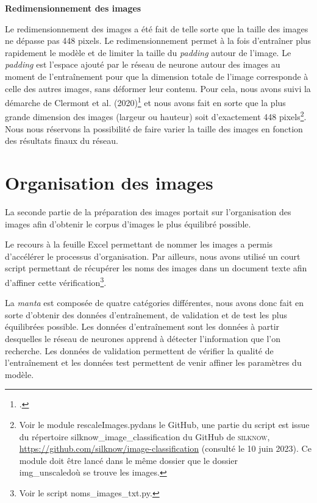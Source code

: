 \documentclass[a4paper, twoside, 12pt]{book}
\begin{document}
\textbf{Redimensionnement des images}

Le redimensionnement des images a été fait de telle sorte que la taille des images ne dépasse pas 448 pixels. Le redimensionnement permet à la fois d'entraîner plus rapidement le modèle et de limiter la taille du \textit{padding} autour de l'image. Le \textit{padding} est l'espace ajouté par le réseau de neurone autour des images au moment de l'entraînement pour que la dimension totale de l'image corresponde à celle des autres images, sans déformer leur contenu. Pour cela, nous avons suivi la démarche de Clermont et al. (2020)\footcite{clermontAssessingSemanticSimilarity2020} et nous avons fait en sorte que la plus grande dimension des images (largeur ou hauteur) soit d'exactement 448 pixels\footnote{Voir le module \og rescaleImages.py\fg \:dans le GitHub, une partie du script est issue du répertoire \og silknow\_image\_classification \fg \:du GitHub de \textsc{silknow}, \url{https://github.com/silknow/image-classification} (consulté le 10 juin 2023). Ce module doit être lancé dans le même dossier que le dossier \og \\img\_unscaled\fg \:où se trouve les images.}. Nous nous réservons la possibilité de faire varier la taille des images en fonction des résultats finaux du réseau.

\section{Organisation des images}

La seconde partie de la préparation des images portait sur l'organisation des images afin d'obtenir le corpus d'images le plus équilibré possible.

Le recours à la feuille Excel permettant de nommer les images a permis d'accélérer le processus d'organisation. Par ailleurs, nous avons utilisé un court script permettant de récupérer les noms des images dans un document texte afin d'affiner cette vérification\footnote{Voir le script \og noms\_images\_txt.py\fg.}.

La \textit{manta} est composée de quatre catégories différentes, nous avons donc fait en sorte d'obtenir des données d'entraînement, de validation et de test les plus équilibrées possible. Les données d'entraînement sont les données à partir desquelles le réseau de neurones \og apprend \fg \:à détecter l'information que l'on recherche. Les données de validation permettent de vérifier la qualité de l'entraînement et les données test permettent de venir affiner les paramètres du modèle.
\end{document}
